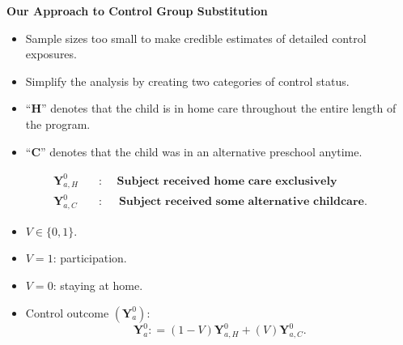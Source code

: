 \documentclass[static]{JJH-Beamer}
\begin{document}
\begin{frame}

\begin{center}
\textbf{Our Approach to Control Group Substitution}
\end{center}

\begin{itemize}
\item Sample sizes too small to make credible estimates of detailed control exposures.
\item Simplify the analysis by creating two categories of control status.
\item ``$\bm{H}$'' denotes that the child is in home care throughout the entire length of the program.
\item ``$\bm{C}$'' denotes that the child was in an alternative preschool anytime.
\end{itemize}

\end{frame}

\begin{frame}

\begin{align*}
\bm{Y}_{a,H}^0 \quad &: \quad \textbf{ Subject received home care exclusively} \\
\bm{Y}_{a,C}^0 \quad &: \quad \textbf{ Subject received some alternative childcare}.
\end{align*}

\end{frame}

\begin{frame}

\begin{itemize}
\item $V \in \{0,1\}$.
\item $V=1$: participation.
\item $V=0$: staying at home.
\item Control outcome $(\bm{Y}^0_a)$:
	\begin{equation}
	\bm{Y}^0_a : = \left( 1 - V \right) \bm{Y}^0_{a,H} + \left( V \right) \bm{Y}^0_{a,C}.
	\end{equation}
\end{itemize}

\end{frame}
\end{document}
